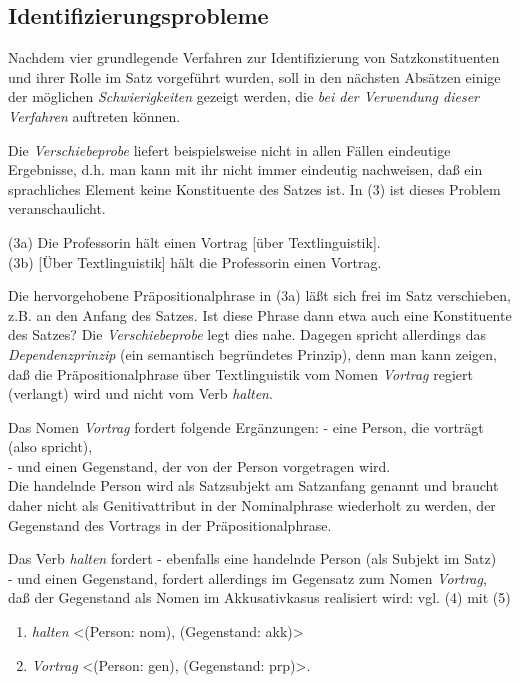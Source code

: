 \documentclass[
  letterpaper,
  DIV=11,
  numbers=noendperiod]{scrreprt}
\providecommand{\tightlist}{%
  \setlength{\itemsep}{0pt}\setlength{\parskip}{0pt}}\usepackage{longtable,booktabs,array}
\begin{document}
\hypertarget{identifizierungsprobleme}{%
\subsection{Identifizierungsprobleme}\label{identifizierungsprobleme}}

Nachdem vier grundlegende Verfahren zur Identifizierung von
Satzkonstituenten und ihrer Rolle im Satz vorgeführt wurden, soll in den
nächsten Absätzen einige der möglichen \emph{Schwierigkeiten} gezeigt
werden, die \emph{bei der Verwendung dieser Verfahren} auftreten können.

Die \emph{Verschiebeprobe} liefert beispielsweise nicht in allen Fällen
eindeutige Ergebnisse, d.h. man kann mit ihr nicht immer eindeutig
nachweisen, daß ein sprachliches Element keine Konstituente des Satzes
ist. In (3) ist dieses Problem veranschaulicht.

(3a) Die Professorin hält einen Vortrag {[}über Textlinguistik{]}.\\
(3b) {[}Über Textlinguistik{]} hält die Professorin einen Vortrag.

Die hervorgehobene Präpositionalphrase in (3a) läßt sich frei im Satz
verschieben, z.B. an den Anfang des Satzes. Ist diese Phrase dann etwa
auch eine Konstituente des Satzes? Die \emph{Verschiebeprobe} legt dies
nahe. Dagegen spricht allerdings das \emph{Dependenzprinzip} (ein
semantisch begründetes Prinzip), denn man kann zeigen, daß die
Präpositionalphrase über Textlinguistik vom Nomen \emph{Vortrag} regiert
(verlangt) wird und nicht vom Verb \emph{halten}.

Das Nomen \emph{Vortrag} fordert folgende Ergänzungen: - eine Person,
die vorträgt (also spricht),\\
- und einen Gegenstand, der von der Person vorgetragen wird.\\
Die handelnde Person wird als Satzsubjekt am Satzanfang genannt und
braucht daher nicht als Genitivattribut in der Nominalphrase wiederholt
zu werden, der Gegenstand des Vortrags in der Präpositionalphrase.

Das Verb \emph{halten} fordert - ebenfalls eine handelnde Person (als
Subjekt im Satz)\\
- und einen Gegenstand, fordert allerdings im Gegensatz zum Nomen
\emph{Vortrag}, daß der Gegenstand als Nomen im Akkusativkasus
realisiert wird: vgl. (4) mit (5)

\begin{enumerate}
\def\labelenumi{(\arabic{enumi})}
\setcounter{enumi}{3}
\tightlist
\item
  \emph{halten} \textless(Person: nom), (Gegenstand: akk)\textgreater{}
\item
  \emph{Vortrag} \textless(Person: gen), (Gegenstand: prp)\textgreater.
\end{enumerate}
\end{document}

